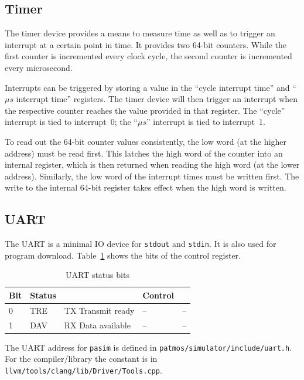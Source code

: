 \documentclass[a4paper,fontsize=10pt,twoside,DIV15,BCOR12mm,headinclude=true,footinclude=false,pagesize,bibtotoc]{scrbook}
\newcommand{\code}[1]{{\texttt{#1}}}
\begin{document}
\subsection{Timer}

The timer device provides a means to measure time as well as to
trigger an interrupt at a certain point in time. It provides two
64-bit counters. While the first counter is incremented every clock
cycle, the second counter is incremented every microsecond.

Interrupts can be triggered by storing a value in the ``cycle
interrupt time'' and ``$\mu s$ interrupt time'' registers. The timer
device will then trigger an interrupt when the respective counter
reaches the value provided in that register. The ``cycle'' interrupt
is tied to interrupt~0; the ``$\mu s$'' interrupt is tied to
interrupt~1.

To read out the 64-bit counter values consistently, the low word (at
the higher address) must be read first. This latches the high word of
the counter into an internal register, which is then returned when
reading the high word (at the lower address). Similarly, the low word
of the interrupt times must be written first. The write to the
internal 64-bit register takes effect when the high word is written.

\subsection{UART}

The UART is a minimal IO device for \texttt{stdout} and \texttt{stdin}.
It is also used for program download. Table~\ref{tab:uart} shows the
bits of the control register.

\begin{table}
\centering
\begin{tabular}{lllll}
\toprule
Bit & Status & & Control & \\
\midrule
0 & TRE & TX Transmit ready & -- & -- \\
1 & DAV & RX Data available & -- & -- \\
\bottomrule
\end{tabular}
\caption{UART status bits} %
\label{tab:uart}
\end{table}

The UART address for \code{pasim} is defined in \code{patmos/simulator/include/uart.h}.
For the compiler/library the constant is in \code{llvm/tools/clang/lib/Driver/Tools.cpp}.
\end{document}
